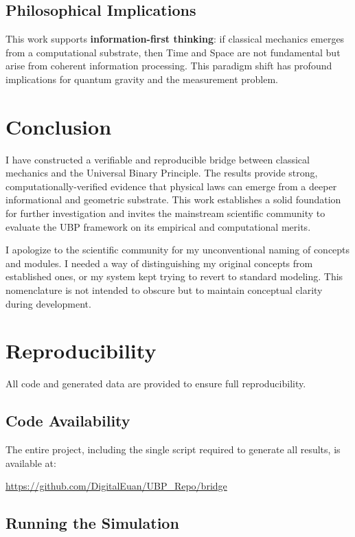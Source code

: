 \documentclass[11pt,a4paper]{article}
\begin{document}
\subsection{Philosophical Implications}

This work supports \textbf{information-first thinking}: if classical mechanics emerges from a computational substrate, then Time and Space are not fundamental but arise from coherent information processing. This paradigm shift has profound implications for quantum gravity and the measurement problem.

\section{Conclusion}

I have constructed a verifiable and reproducible bridge between classical mechanics and the Universal Binary Principle. The results provide strong, computationally-verified evidence that physical laws can emerge from a deeper informational and geometric substrate. This work establishes a solid foundation for further investigation and invites the mainstream scientific community to evaluate the UBP framework on its empirical and computational merits.

I apologize to the scientific community for my unconventional naming of concepts and modules. I needed a way of distinguishing my original concepts from established ones, or my system kept trying to revert to standard modeling. This nomenclature is not intended to obscure but to maintain conceptual clarity during development.

\section{Reproducibility}

All code and generated data are provided to ensure full reproducibility.

\subsection{Code Availability}

The entire project, including the single script required to generate all results, is available at:

\begin{center}
\url{https://github.com/DigitalEuan/UBP_Repo/bridge}
\end{center}

\subsection{Running the Simulation}
\end{document}
